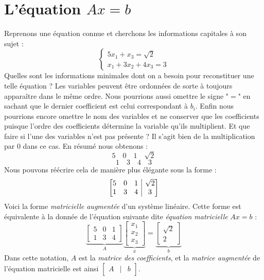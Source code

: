 \section{L'équation $Ax = b$}
\noindent Reprenons une équation connue et cherchons les informations capitales à son sujet : 
$$ \begin{cases}5x_1 + x_3 = \sqrt{2}\\x_1 + 3x_2 +4x_3 = 3\end{cases} $$
\noindent Quelles sont les informations minimales dont on a besoin pour reconstituer une telle équation ? Les variables peuvent être ordonnées de sorte à toujours apparaître dans le même ordre. Nous pourrions aussi omettre le signe "$=$" en sachant que le dernier coefficient est celui correspondant à $b_i$. Enfin nous pourrions encore omettre le nom des variables et ne conserver que les coefficients puisque l'ordre des coefficients détermine la variable qu'ils multiplient. Et que faire si l'une des variables n'est pas présente ? Il s'agit bien de la multiplication par $0$ dans ce cas. En résumé nous obtenons :
$$ 5 \quad 0 \quad 1 \quad \sqrt{2}$$
$$ 1 \quad 3 \quad 4 \quad 3 $$
Nous pouvons réécrire cela de manière plus élégante sous la forme :
$$ 
\left[
\begin{array}{@{}ccc|c@{}}
5 & 0 & 1 & \sqrt{2} \\
1 & 3 & 4 & 3 \\
\end{array}
\right]
$$
\noindent Voici la forme \textit{matricielle augmentée} d'un système linéaire. Cette forme est équivalente à la donnée de l'équation suivante dite \textit{équation matricielle} $Ax = b$ :
$$\underbrace{\begin{bmatrix}
5 & 0 & 1 \\
1 & 3 & 4 
\end{bmatrix}}_{A}\underbrace{\begin{bmatrix}
x_1 \\ x_2 \\ x_3
\end{bmatrix}}_{x} = \underbrace{\begin{bmatrix}
\sqrt{2} \\ 2
\end{bmatrix}}_{b}
$$
Dans cette notation, $A$ est la \textit{matrice des coefficients}, et la \textit{matrice augmentée} de l'équation matricielle est ainsi $\begin{bmatrix}
A & | & b
\end{bmatrix}$.

